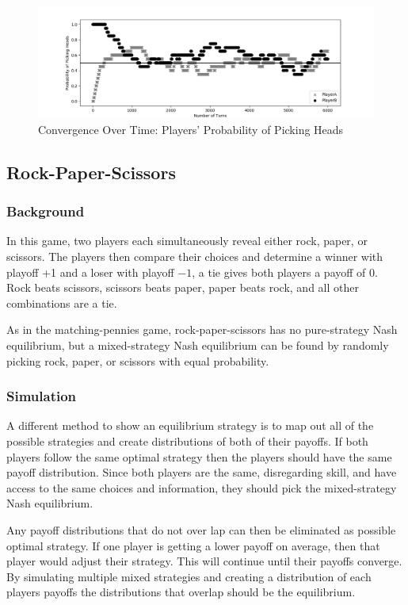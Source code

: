 \begin{figure}[h]
\caption{Convergence Over Time: Players' Probability of Picking Heads}
\hspace*{-2.5cm} 
\includegraphics[scale=0.6]{../Figures/scatter_1.png}
\end{figure}

\FloatBarrier
\subsection{Rock-Paper-Scissors}

\subsubsection{Background}
In this game, two players each simultaneously reveal either rock, paper, or scissors. The players then  compare their choices and determine a winner with playoff +1 and a loser with playoff $-1$, a tie gives both players a payoff of 0. Rock beats scissors, scissors beats paper, paper beats rock, and all other combinations are a tie.

As in the matching-pennies game, rock-paper-scissors has no pure-strategy Nash equilibrium, but a mixed-strategy Nash equilibrium can be found by randomly picking rock, paper, or scissors with equal probability.


\subsubsection{Simulation}
A different method to show an equilibrium strategy is to map out all of the possible strategies and create distributions of both of their payoffs. If both players follow the same optimal strategy then the players should have the same payoff distribution. Since both players are the same, disregarding skill, and have access to the same choices and information, they should pick the mixed-strategy Nash equilibrium. 

Any payoff distributions that do not over lap can then be eliminated as possible optimal strategy. If one player is getting a lower payoff on average, then that player would adjust their strategy. This will continue until their payoffs converge. By simulating multiple mixed strategies and creating a distribution of each players payoffs the distributions that overlap should be the equilibrium.

